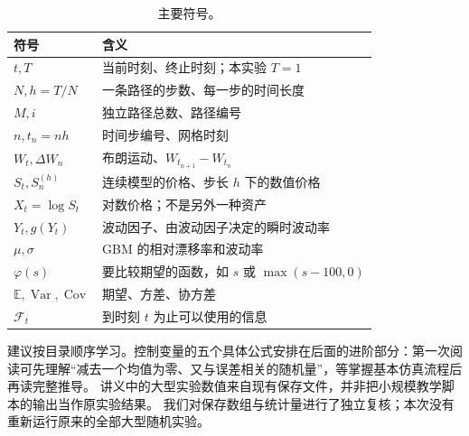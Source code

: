 \documentclass[11pt,a4paper,fontset=none]{ctexart}
\numberwithin{equation}{section}
\newcommand{\E}{\mathbb E}
\DeclareMathOperator{\Var}{Var}
\DeclareMathOperator{\Cov}{Cov}
\begin{document}
\begin{table}[htbp]\centering
\caption{主要符号。}\label{tab:notation}
\begin{tabularx}{\textwidth}{lY}\toprule
符号 & 含义\\\midrule
$t,T$ & 当前时刻、终止时刻；本实验 $T=1$\\
$N,h=T/N$ & 一条路径的步数、每一步的时间长度\\
$M,i$ & 独立路径总数、路径编号\\
$n,t_n=nh$ & 时间步编号、网格时刻\\
$W_t,\Delta W_n$ & 布朗运动、$W_{t_{n+1}}-W_{t_n}$\\
$S_t,S_n^{(h)}$ & 连续模型的价格、步长 $h$ 下的数值价格\\
$X_t=\log S_t$ & 对数价格；不是另外一种资产\\
$Y_t,g(Y_t)$ & 波动因子、由波动因子决定的瞬时波动率\\
$\mu,\sigma$ & GBM 的相对漂移率和波动率\\
$\varphi(s)$ & 要比较期望的函数，如 $s$ 或 $\max(s-100,0)$\\
$\E,\Var,\Cov$ & 期望、方差、协方差\\
$\mathcal F_t$ & 到时刻 $t$ 为止可以使用的信息\\\bottomrule
\end{tabularx}
\end{table}

建议按目录顺序学习。控制变量的五个具体公式安排在后面的进阶部分：第一次阅读可先理解“减去一个均值为零、又与误差相关的随机量”，等掌握基本仿真流程后再读完整推导。
讲义中的大型实验数值来自现有保存文件，并非把小规模教学脚本的输出当作原实验结果。
我们对保存数组与统计量进行了独立复核；本次没有重新运行原来的全部大型随机实验。
\end{document}
